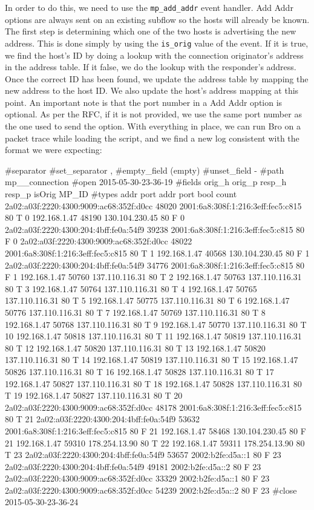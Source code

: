 In order to do this, we need to use the \texttt{mp\_add\_addr} event handler. Add Addr options are always sent on an existing subflow so the hosts will already be known. The first step is determining which one of the two hosts is advertising the new address. This is done simply by using the \texttt{is\_orig} value of the event. If it is true, we find the host's ID by doing a lookup with the connection originator's address in the address table. If it false, we do the lookup with the responder's address. Once the correct ID has been found, we update the address table by mapping the new address to the host ID. We also update the host's address mapping at this point. An important note is that the port number in a Add Addr option is optional. As per the RFC, if it is not provided, we  use the same port number as the one used to send the option. With everything in place, we can run Bro on a packet trace while loading the script, and we find a new log consistent with the format we were expecting: \\

\begin{code}
#separator 
#set_separator	,
#empty_field	(empty)
#unset_field	-
#path	mp__connection
#open	2015-05-30-23-36-19
#fields	orig_h	orig_p	resp_h	resp_p	isOrig  MP_ID
#types	addr	port	addr	port	bool	count
2a02:a03f:2220:4300:9009:ac68:352f:d0cc	48020	2001:6a8:308f:1:216:3eff:fec5:c815	80	T	0
192.168.1.47	48190	130.104.230.45	80	F	0
2a02:a03f:2220:4300:204:4bff:fe0a:54f9	39238	2001:6a8:308f:1:216:3eff:fec5:c815	80	F	0
2a02:a03f:2220:4300:9009:ac68:352f:d0cc	48022	2001:6a8:308f:1:216:3eff:fec5:c815	80	T	1
192.168.1.47	40568	130.104.230.45	80	F	1
2a02:a03f:2220:4300:204:4bff:fe0a:54f9	34776	2001:6a8:308f:1:216:3eff:fec5:c815	80	F	1
192.168.1.47	50760	137.110.116.31	80	T	2
192.168.1.47	50763	137.110.116.31	80	T	3
192.168.1.47	50764	137.110.116.31	80	T	4
192.168.1.47	50765	137.110.116.31	80	T	5
192.168.1.47	50775	137.110.116.31	80	T	6
192.168.1.47	50776	137.110.116.31	80	T	7
192.168.1.47	50769	137.110.116.31	80	T	8
192.168.1.47	50768	137.110.116.31	80	T	9
192.168.1.47	50770	137.110.116.31	80	T	10
192.168.1.47	50818	137.110.116.31	80	T	11
192.168.1.47	50819	137.110.116.31	80	T	12
192.168.1.47	50820	137.110.116.31	80	T	13
192.168.1.47	50820	137.110.116.31	80	T	14
192.168.1.47	50819	137.110.116.31	80	T	15
192.168.1.47	50826	137.110.116.31	80	T	16
192.168.1.47	50828	137.110.116.31	80	T	17
192.168.1.47	50827	137.110.116.31	80	T	18
192.168.1.47	50828	137.110.116.31	80	T	19
192.168.1.47	50827	137.110.116.31	80	T	20
2a02:a03f:2220:4300:9009:ac68:352f:d0cc	48178	2001:6a8:308f:1:216:3eff:fec5:c815	80	T	21
2a02:a03f:2220:4300:204:4bff:fe0a:54f9	53632	2001:6a8:308f:1:216:3eff:fec5:c815	80	F	21
192.168.1.47	58468	130.104.230.45	80	F	21
192.168.1.47	59310	178.254.13.90	80	T	22
192.168.1.47	59311	178.254.13.90	80	T	23
2a02:a03f:2220:4300:204:4bff:fe0a:54f9	53657	2002:b2fe:d5a::1	80	F	23
2a02:a03f:2220:4300:204:4bff:fe0a:54f9	49181	2002:b2fe:d5a::2	80	F	23
2a02:a03f:2220:4300:9009:ac68:352f:d0cc	33329	2002:b2fe:d5a::1	80	F	23
2a02:a03f:2220:4300:9009:ac68:352f:d0cc	54239	2002:b2fe:d5a::2	80	F	23
#close	2015-05-30-23-36-24
\end{code}


